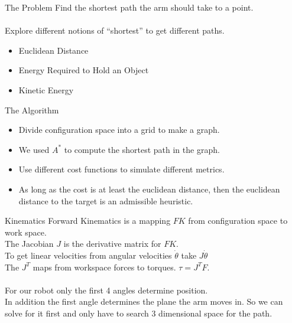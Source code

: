 \documentclass{beamer}
\begin{document}
\begin{frame}{The Problem}
Find the shortest path the arm should take to a point.\\
~\\
Explore different notions of ``shortest'' to get different paths.
\begin{itemize}
\item Euclidean Distance
\item Energy Required to Hold an Object
\item Kinetic Energy
\end{itemize}
\end{frame}
\begin{frame}{The Algorithm}
\begin{itemize}
\item Divide configuration space into a grid to make a graph.
\item We used $A^*$ to compute the shortest path in the graph.
\item Use different cost functions to simulate different metrics.
\item As long as the cost is at least the euclidean distance, then the euclidean distance to the target is an admissible heuristic.
\end{itemize}
\end{frame}
\begin{frame}{Kinematics}
Forward Kinematics is a mapping $FK$ from configuration space to work space.\\
The Jacobian $J$ is the derivative matrix for $FK$.\\
To get linear velocities from angular velocities $\dot{\theta}$ take $J\dot{\theta}$\\
The $J^T$ maps from workspace forces to torques. $\tau = J^TF$.\\
~\\
For our robot only the first 4 angles determine position.\\
In addition the first angle determines the plane the arm moves in. So we can solve for it first and only have to search 3 dimensional space for the path.
\end{frame}
\end{document}
